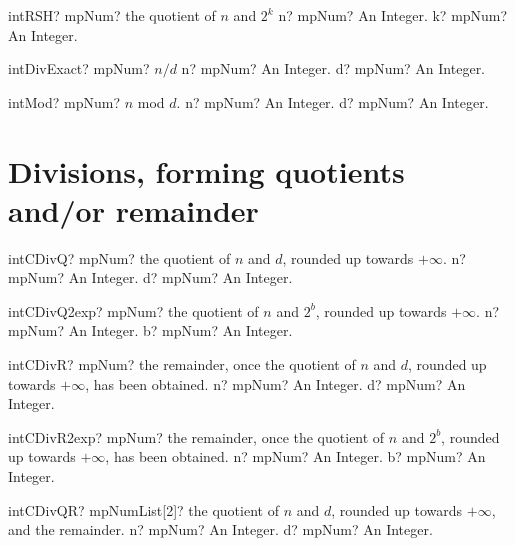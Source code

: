 \documentclass[12pt,a4paper,openany]{book}
\begin{document}
\begin{mpFunctionsExtract}
\mpFunctionTwo
{intRSH? mpNum? the quotient of $n$ and $2^k$}
{n? mpNum? An Integer.}
{k? mpNum? An Integer.}
\end{mpFunctionsExtract}

\begin{mpFunctionsExtract}
\mpFunctionTwo
{intDivExact? mpNum? $n/d$}
{n? mpNum? An Integer.}
{d? mpNum? An Integer.}
\end{mpFunctionsExtract}

\begin{mpFunctionsExtract}
\mpFunctionTwo
{intMod? mpNum? $n$ mod $d$.}
{n? mpNum? An Integer.}
{d? mpNum? An Integer.}
\end{mpFunctionsExtract}

\section{Divisions, forming quotients and/or remainder}

\begin{mpFunctionsExtract}
\mpFunctionTwo
{intCDivQ? mpNum? the quotient of $n$ and $d$, rounded up towards $+\infty$.}
{n? mpNum? An Integer.}
{d? mpNum? An Integer.}
\end{mpFunctionsExtract}

\begin{mpFunctionsExtract}
\mpFunctionTwo
{intCDivQ2exp? mpNum? the quotient of $n$ and $2^b$, rounded up towards $+\infty$.}
{n? mpNum? An Integer.}
{b? mpNum? An Integer.}
\end{mpFunctionsExtract}

\begin{mpFunctionsExtract}
\mpFunctionTwo
{intCDivR? mpNum? the remainder, once the quotient of $n$ and $d$, rounded up towards $+\infty$, has been obtained.}
{n? mpNum? An Integer.}
{d? mpNum? An Integer.}
\end{mpFunctionsExtract}

\begin{mpFunctionsExtract}
\mpFunctionTwo
{intCDivR2exp? mpNum? the remainder, once the quotient of $n$ and $2^b$, rounded up towards $+\infty$, has been obtained.}
{n? mpNum? An Integer.}
{b? mpNum? An Integer.}
\end{mpFunctionsExtract}

\begin{mpFunctionsExtract}
\mpFunctionTwo
{intCDivQR? mpNumList[2]? the quotient of $n$ and $d$, rounded up towards $+\infty$, and the remainder.}
{n? mpNum? An Integer.}
{d? mpNum? An Integer.}
\end{mpFunctionsExtract}
\end{document}
